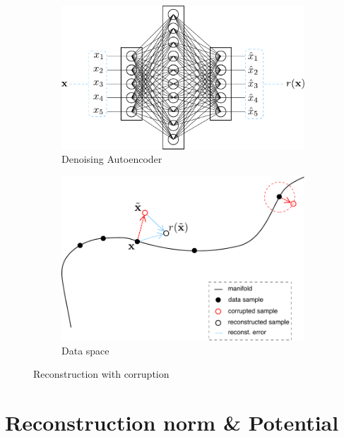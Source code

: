 \begin{figure}[!h]
\centering
\begin{subfigure}{.5\textwidth}
  \centering
  \includegraphics[width=.75\linewidth]{figures/autoencoder-overcomplete}
  \caption{Denoising Autoencoder}
  \label{fig:dae}
\end{subfigure}%
\begin{subfigure}{.5\textwidth}
  \centering
  \includegraphics[width=.75\linewidth]{figures/reconstruction-denoising}
  \caption{Data space}
  \label{fig:dae-process}
\end{subfigure}
\caption{Reconstruction with corruption}
\end{figure}


\section{Reconstruction norm \& Potential}

